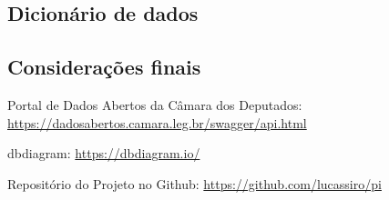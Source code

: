 \documentclass[12pt, a4paper]{article}
\begin{document}
\subsection{Dicionário de dados}
\subsection{Considerações finais}


\begin{thebibliography}{9}
     Portal de Dados Abertos da Câmara dos Deputados: 
    \href{https://dadosabertos.camara.leg.br/swagger/api.html}{https://dadosabertos.camara.leg.br/swagger/api.html}

     dbdiagram: 
    \href{https://dbdiagram.io/}{https://dbdiagram.io/}

     Repositório do Projeto no Github: 
    \href{https://github.com/lucassiro/pi}{https://github.com/lucassiro/pi}
\end{thebibliography}
\end{document}
